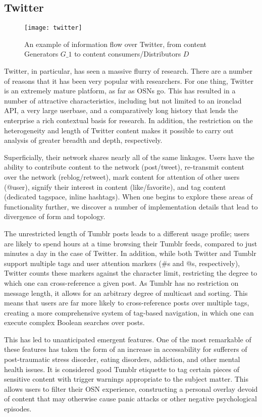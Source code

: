 \subsection{Twitter}
\begin{figure}[bht]
\centering
 \texttt{[image: twitter]}
 \caption{An example of information flow over Twitter, from content Generators \(G\_1\) to content consumers/Distributors \(D\)}
 \label{fig:twitter}
\end{figure}
Twitter, in particular, has seen a massive flurry of research.  There 
are a number of reasons that it has been very popular with researchers.  
For one thing, Twitter is an extremely mature platform, as far as OSNs 
go.  This has resulted in a number of attractive characteristics, 
including but not limited to an ironclad API, a very large userbase\cite{kgjahlk}, 
and a comparatively long history that lends the enterprise a rich 
contextual basis for research.  In addition, the restriction on the 
heterogeneity and length of Twitter content makes it possible to carry 
out analysis of greater breadth and depth, respectively.


Superficially, their network shares nearly all of the same linkages.  
Users have the ability to contribute content to the network 
(post/tweet), re-transmit content over the network (reblog/retweet), 
mark content for attention of other users (@user), signify their 
interest in content (like/favorite), and tag content (dedicated 
tagspace, inline hashtags). When one begins to explore these areas of 
functionality further, we discover a number of implementation details 
that lead to divergence of form and topology.  

The unrestricted length of Tumblr posts leads to a different usage 
profile; users are likely to spend hours at a time\cite{fox2012much} 
browsing their Tumblr feeds, compared to just minutes a day in the case 
of Twitter.  In addition, while both Twitter and Tumblr support multiple 
tags and user attention markers (\#s and @s, respectively), Twitter 
counts these markers against the character limit, restricting the degree 
to which one can cross-reference a given post.  As Tumblr has no restriction 
on message length, it allows for an arbitrary degree of multicast and 
sorting.  This means that users are far more likely to cross-reference 
posts over multiple tags, creating a more comprehensive system of tag-based 
navigation, in which one can execute complex Boolean searches over posts.  


This has led to unanticipated emergent features. One of the most 
remarkable of these features has taken the form of an increase in 
accessability for sufferers of post-traumatic stress disorder, 
eating disorders\cite{callaghan2013research}, addiction, and other 
mental health issues.  It is considered good Tumblr etiquette to tag 
certain pieces of sensitive content with trigger warnings\cite{bell2013trigger} 
appropriate to the subject matter.  This allows users to filter their 
OSN experience, constructing a personal overlay devoid of content that 
may otherwise cause panic attacks or other negative psychological episodes.


